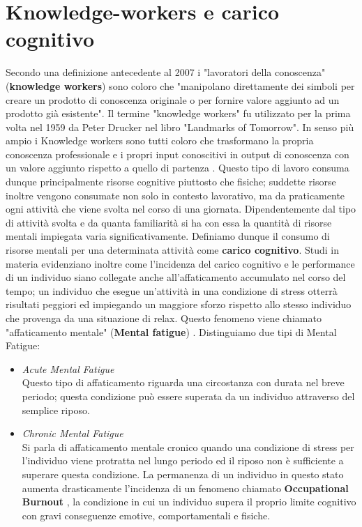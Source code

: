 \section{Knowledge-workers e carico cognitivo}
Secondo una definizione antecedente al 2007 i "lavoratori della conoscenza" ({\bf knowledge workers}) sono coloro che "manipolano direttamente dei simboli per creare un prodotto di conoscenza originale o per fornire valore aggiunto ad un prodotto già esistente".\newline
Il termine "knowledge workers" fu utilizzato per la prima volta nel 1959 da Peter Drucker nel libro "Landmarks of Tomorrow".\newline
In senso più ampio i Knowledge workers sono tutti coloro che trasformano la propria conoscenza professionale e i propri input conoscitivi in output di conoscenza con un valore aggiunto rispetto a quello di partenza \cite{knowledge_workers}.\newline
Questo tipo di lavoro consuma dunque principalmente risorse cognitive piuttosto che fisiche; suddette risorse inoltre vengono consumate non solo in contesto lavorativo, ma da praticamente ogni attività che viene svolta nel corso di una giornata.\newline
Dipendentemente dal tipo di attività svolta e da quanta familiarità si ha con essa la quantità di risorse mentali impiegata varia significativamente.\newline
Definiamo dunque il consumo di risorse mentali per una determinata attività come {\bf carico cognitivo}.\newline
Studi in materia evidenziano inoltre come l'incidenza del carico cognitivo e le performance di un individuo siano collegate anche all'affaticamento accumulato nel corso del tempo; un individuo che esegue un'attività in una condizione di stress otterrà risultati peggiori ed impiegando un maggiore sforzo rispetto allo stesso individuo che provenga da una situazione di relax.\newline
Questo fenomeno viene chiamato "affaticamento mentale" ({\bf Mental fatigue}) \cite{mental_fatigue}.\newline
Distinguiamo due tipi di Mental Fatigue:
\begin{itemize}
  \item \emph{Acute Mental Fatigue}\\
  {Questo tipo di affaticamento riguarda una circostanza con durata nel breve periodo; questa condizione può essere superata da un individuo attraverso del semplice riposo.}
  \item \emph{Chronic Mental Fatigue}\\
  {Si parla di affaticamento mentale cronico quando una condizione di stress per l'individuo viene protratta nel lungo periodo ed il riposo non è sufficiente a superare questa condizione. La permanenza di un individuo in questo stato aumenta drasticamente l'incidenza di un fenomeno chiamato {\bf Occupational Burnout} \cite{occupational_burnout}, la condizione in cui un individuo supera il proprio limite cognitivo con gravi conseguenze emotive, comportamentali e fisiche.}
\end{itemize}
